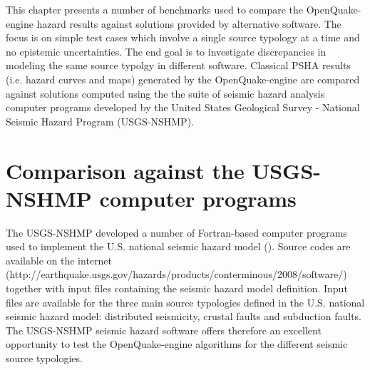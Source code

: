 This chapter presents a number of benchmarks used to compare the
OpenQuake-engine hazard results against solutions provided by alternative
software. The focus is on simple test cases which involve a single source
typology at a time and no epistemic uncertainties. The end goal is to
investigate discrepancies in modeling the same source typolgy in different
software. Classical PSHA results (i.e. hazard curves and maps) generated by the
OpenQuake-engine are compared against solutions computed using the the suite of
seismic hazard analysis computer programs developed by the United States
Geological Survey - National Seismic Hazard Program (USGS-NSHMP).
%
\section{Comparison against the USGS-NSHMP computer programs}
The USGS-NSHMP developed a number of Fortran-based computer programs used to
implement the U.S. national seismic hazard model (\cite{petersen2008}). Source
codes are available on the internet
(http://earthquake.usgs.gov/hazards/products/conterminous/2008/software/)
together with input files containing the seismic hazard model definition. Input
files are available for the three main source typologies defined in the U.S.
national seismic hazard model: distributed seismicity, crustal faults and
subduction faults.  The USGS-NSHMP seismic hazard software offers therefore an
excellent opportunity to test the OpenQuake-engine algorithms for the different
seismic source typologies.
%
